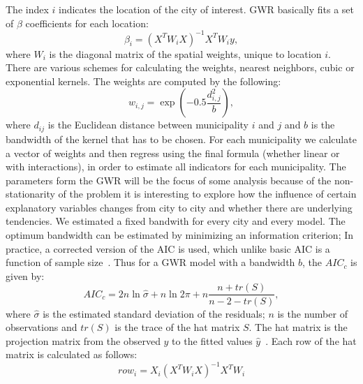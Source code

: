 \documentclass[12pt]{article}
\begin{document}
The index $i$ indicates the location of the city of interest. GWR basically fits a set of $\beta$ coefficients for each location:
\begin{equation}
\beta_i=(X^TW_iX)^{-1}X^TW_iy,
\end{equation}
where $W_i$ is the diagonal matrix of the spatial weights, unique to location $i$. There are various schemes for calculating the weights, nearest neighbors, cubic or exponential kernels.  The weights are computed by the following:
%
\begin{equation}
w_{i,j}=\exp(-0.5\frac{d_{i,j}^{2}}{b}),
\end{equation}
%
where $d_{ij}$ is the Euclidean distance between municipality $i$ and $j$ and $b$ is the bandwidth of the kernel that has to be chosen. For each municipality we calculate a vector of weights and then regress using the final formula (whether linear or with interactions), in order to estimate all indicators for each municipality. The parameters form the GWR will be the focus of some analysis because of the non-stationarity of the problem it is interesting to explore how the influence of certain explanatory variables changes from city to city and whether there are underlying tendencies. 
%
We estimated a fixed bandwith for every city and every model. The optimum bandwidth can be estimated by minimizing an information criterion; In practice, a corrected version of the AIC is used, which unlike basic AIC is a function of sample size~\cite{hurvich1998smoothing}.  Thus for a GWR model with a bandwidth $b$, the $AIC_c$ is given by:
%
\begin{equation}
AIC_{c}=2n\ln{\hat{\sigma}}+n\ln{2\pi}+n\frac{n+tr(S)}{n-2-tr(S)},
\end{equation}
%
where $\hat{\sigma}$ is the estimated standard deviation of the residuals; $n$ is the number of observations and $tr(S)$ is the trace of the hat matrix $S$. The hat matrix is the projection matrix from the observed $y$ to the fitted values $\hat{y}$~\cite{hoaglin1978hat}. Each row of the hat matrix is calculated as follows:
%
\begin{equation}
row_i=X_i(X^{T}W_iX)^{-1}X^{T}W_i
\end{equation}
\end{document}
